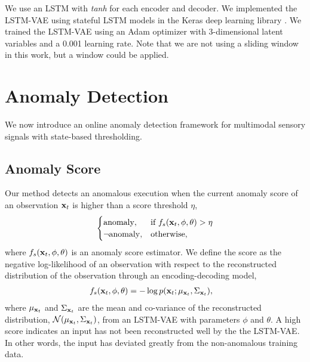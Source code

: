 \documentclass[letterpaper, 10 pt, conference]{ieeeconf}
\newcommand{\vx}{{\bf x}}
\begin{document}
We use an LSTM with \textit{tanh} for each encoder and decoder. We implemented the LSTM-VAE using stateful LSTM models in the Keras deep learning library \cite{chollet2015keras}. We trained the LSTM-VAE using an Adam optimizer with 3-dimensional latent variables and a 0.001 learning rate. Note that we are not using a sliding window in this work, but a window could be applied.


\section{Anomaly Detection}
We now introduce an online anomaly detection framework for multimodal sensory signals with state-based thresholding. 

\subsection{Anomaly Score}
Our method detects an anomalous execution when the current anomaly score of an observation $\vx_t$ is higher than a score threshold $\eta$, 
\begin{align} 
\begin{cases}
\mathrm{anomaly}, & \text{if } f_s(\vx_t, \phi, \theta) > \eta \\
\lnot\mathrm{anomaly}, & \text{otherwise,}
\end{cases}
\label{eq_stc_threshold}
\end{align}
where $f_s(\vx_t, \phi, \theta)$ is an anomaly score estimator. We define the score as the negative log-likelihood of an observation with respect to the reconstructed distribution of the observation through an encoding-decoding model, 
\begin{align}
f_s(\vx_{t}, \phi, \theta) &= -\log p(\vx_t ; \mu_{\vx_t}, \Sigma_{\vx_t}), \label{eq_anomaly_score}
\end{align}
where $\mu_{\vx_t}$ and $\Sigma_{\vx_t}$ are the mean and co-variance of the reconstructed distribution, $\mathcal{N}(\mu_{\vx_t},\Sigma_{\vx_t})$, from an LSTM-VAE with parameters $\phi$ and $\theta$. A high score indicates an input has not been reconstructed well by the the LSTM-VAE. In other words, the input has deviated greatly from the non-anomalous training data. 
\end{document}
